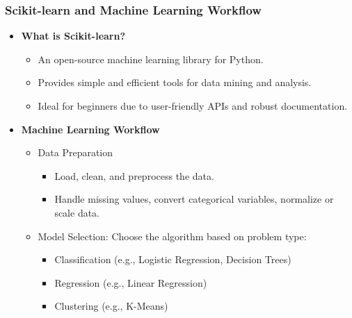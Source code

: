 \documentclass{beamer}
\begin{document}
\begin{frame}
    \frametitle{Scikit-learn and Machine Learning Workflow}

    \begin{itemize}
        \item \textbf{What is Scikit-learn?}
        \begin{itemize}
            \item An open-source machine learning library for Python.
            \item Provides simple and efficient tools for data mining and analysis.
            \item Ideal for beginners due to user-friendly APIs and robust documentation.
        \end{itemize}

        \item \textbf{Machine Learning Workflow}
        \begin{itemize}
            \item Data Preparation
            \begin{itemize}
                \item Load, clean, and preprocess the data.
                \item Handle missing values, convert categorical variables, normalize or scale data.
            \end{itemize}
            \item Model Selection: Choose the algorithm based on problem type:
            \begin{itemize}
                \item Classification (e.g., Logistic Regression, Decision Trees)
                \item Regression (e.g., Linear Regression)
                \item Clustering (e.g., K-Means)
            \end{itemize}
        \end{itemize}
    \end{itemize}
\end{frame}
\end{document}
